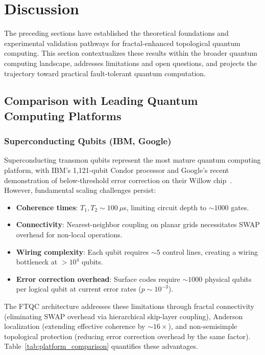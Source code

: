 
\section{Discussion}
\label{sec:discussion}

The preceding sections have established the theoretical foundations and experimental validation pathways for fractal-enhanced topological quantum computing. This section contextualizes these results within the broader quantum computing landscape, addresses limitations and open questions, and projects the trajectory toward practical fault-tolerant quantum computation.

\subsection{Comparison with Leading Quantum Computing Platforms}

\subsubsection{Superconducting Qubits (IBM, Google)}

Superconducting transmon qubits represent the most mature quantum computing platform, with IBM's 1,121-qubit Condor processor and Google's recent demonstration of below-threshold error correction on their Willow chip~\cite{Google2024}. However, fundamental scaling challenges persist:

\begin{itemize}
\item \textbf{Coherence times}: $T_1, T_2 \sim 100~\mu$s, limiting circuit depth to $\sim 1000$ gates.
\item \textbf{Connectivity}: Nearest-neighbor coupling on planar grids necessitates SWAP overhead for non-local operations.
\item \textbf{Wiring complexity}: Each qubit requires $\sim 5$ control lines, creating a wiring bottleneck at $> 10^4$ qubits.
\item \textbf{Error correction overhead}: Surface codes require $\sim 1000$ physical qubits per logical qubit at current error rates ($p \sim 10^{-3}$).
\end{itemize}

The FTQC architecture addresses these limitations through fractal connectivity (eliminating SWAP overhead via hierarchical skip-layer coupling), Anderson localization (extending effective coherence by $\sim 16\times$), and non-semisimple topological protection (reducing error correction overhead by the same factor). Table~\ref{tab:platform_comparison} quantifies these advantages.

